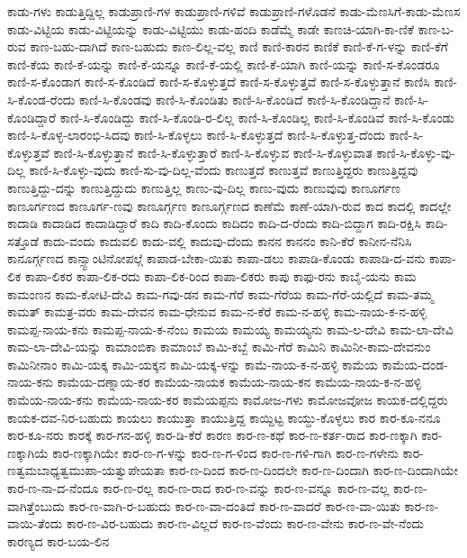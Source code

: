 ಕಾಡು-ಗಳು
ಕಾಡುತ್ತಿದ್ದಿಲ್ಲ
ಕಾಡುಪ್ರಾಣಿ-ಗಳ
ಕಾಡುಪ್ರಾಣಿ-ಗಳಿವೆ
ಕಾಡುಪ್ರಾಣಿ-ಗಳೊಡನೆ
ಕಾಡು-ಮೆಣಸಿಗೆ-ಕಾಡು-ಮೆಣಸ
ಕಾಡು-ವಿಟ್ಟಿಯ
ಕಾಡು-ವಿಟ್ಟಿಯನ್ನು
ಕಾಡು-ವಿಟ್ಟಿಯು
ಕಾಡು-ಹಂದಿ
ಕಾಡೆಮ್ಮೆ
ಕಾಡೇ
ಕಾಣಚಿ-ಯಾಗಿ-ಕಾ-ಣಿಕೆ
ಕಾಣ-ಬ-ರುವ
ಕಾಣ-ಬಹು-ದಾಗಿದೆ
ಕಾಣ-ಬಹುದು
ಕಾಣ-ಲಿಲ್ಲ-ವಲ್ಲ
ಕಾಣಿ
ಕಾಣಿ-ಕಾರನ
ಕಾಣಿಕೆ
ಕಾಣಿ-ಕೆ-ಗ-ಳನ್ನು
ಕಾಣಿ-ಕೆಗೆ
ಕಾಣಿ-ಕೆಯ
ಕಾಣಿ-ಕೆ-ಯನ್ನು
ಕಾಣಿ-ಕೆ-ಯನ್ನೂ
ಕಾಣಿ-ಕೆ-ಯಲ್ಲಿ
ಕಾಣಿ-ಕೆ-ಯಾಗಿ
ಕಾಣಿ-ಯನ್ನು
ಕಾಣಿ-ಸ-ಕೊಂಡರೂ
ಕಾಣಿ-ಸ-ಕೊಂಡಾಗ
ಕಾಣಿ-ಸ-ಕೊಂಡಿದೆ
ಕಾಣಿ-ಸ-ಕೊಳ್ಳುತ್ತದೆ
ಕಾಣಿ-ಸ-ಕೊಳ್ಳುತ್ತವೆ
ಕಾಣಿ-ಸ-ಕೊಳ್ಳುತ್ತಾನೆ
ಕಾಣಿಸಿ
ಕಾಣಿ-ಸಿ-ಕೊಂಡ-ರೆಂದು
ಕಾಣಿ-ಸಿ-ಕೊಂಡವು
ಕಾಣಿ-ಸಿ-ಕೊಂಡಿತು
ಕಾಣಿ-ಸಿ-ಕೊಂಡಿದೆ
ಕಾಣಿ-ಸಿ-ಕೊಂಡಿದ್ದಾನೆ
ಕಾಣಿ-ಸಿ-ಕೊಂಡಿದ್ದಾರೆ
ಕಾಣಿ-ಸಿ-ಕೊಂಡಿದ್ದು
ಕಾಣಿ-ಸಿ-ಕೊಂಡಿ-ರ-ಲಿಲ್ಲ
ಕಾಣಿ-ಸಿ-ಕೊಂಡಿಲ್ಲ
ಕಾಣಿ-ಸಿ-ಕೊಂಡಿವೆ
ಕಾಣಿ-ಸಿ-ಕೊಂಡು
ಕಾಣಿ-ಸಿ-ಕೊಳ್ಳ-ಲಾರಂಭಿ-ಸಿದವು
ಕಾಣಿ-ಸಿ-ಕೊಳ್ಳಲು
ಕಾಣಿ-ಸಿ-ಕೊಳ್ಳುತ್ತದೆ
ಕಾಣಿ-ಸಿ-ಕೊಳ್ಳುತ್ತ-ದೆಂದು
ಕಾಣಿ-ಸಿ-ಕೊಳ್ಳುತ್ತವೆ
ಕಾಣಿ-ಸಿ-ಕೊಳ್ಳುತ್ತಾನೆ
ಕಾಣಿ-ಸಿ-ಕೊಳ್ಳುತ್ತಾರೆ
ಕಾಣಿ-ಸಿ-ಕೊಳ್ಳುವ
ಕಾಣಿ-ಸಿ-ಕೊಳ್ಳುವಾತ
ಕಾಣಿ-ಸಿ-ಕೊಳ್ಳು-ವು-ದಿಲ್ಲ
ಕಾಣಿ-ಸಿ-ಕೊಳ್ಳು-ವುದು
ಕಾಣಿ-ಸು-ವು-ದಿಲ್ಲ-ವೆಂದು
ಕಾಣುತ್ತದೆ
ಕಾಣುತ್ತವೆ
ಕಾಣುತ್ತಿದ್ದರು
ಕಾಣುತ್ತಿದ್ದವು
ಕಾಣುತ್ತಿದ್ದು-ದನ್ನು
ಕಾಣುತ್ತಿದ್ದುದು
ಕಾಣುತ್ತಿಲ್ಲ
ಕಾಣು-ವು-ದಿಲ್ಲ
ಕಾಣು-ವುದು
ಕಾಣುವುವು
ಕಾಣೂರ್ಗಣ
ಕಾಣೂರ್ಗಣದ
ಕಾಣೂರ್ಗ-ಣವು
ಕಾಣೂರ್ಗ್ಗಣ
ಕಾಣೂರ್ಗ್ಗಣದ
ಕಾಣೆಮೆ
ಕಾಣೆ-ಯಾಗಿ-ರುವ
ಕಾದ
ಕಾದಲ್ಲಿ
ಕಾದಲ್ಲೇ
ಕಾದಾಡಿ
ಕಾದಾಡಿದ
ಕಾದಾಡಿದ್ದಾರೆ
ಕಾದಿ
ಕಾದಿ-ಕೊಂದು
ಕಾದಿದಂ
ಕಾದಿ-ದ-ರೆಂದು
ಕಾದಿ-ಬಿದ್ದಾಗ
ಕಾದಿ-ರಕ್ಷಿಸಿ
ಕಾದಿ-ಸತ್ತೊಡೆ
ಕಾದು-ವಂದು
ಕಾದುವಲಿ
ಕಾದು-ವಲ್ಲಿ
ಕಾದುವು-ದೆಂದು
ಕಾನನ
ಕಾನನಂ
ಕಾನಿ-ಕೆರೆ
ಕಾನೀನ-ನೆನಿಸಿ
ಕಾನೂರ್ಗ್ಗಣದ
ಕಾನ್ಸ್ಟಾಂಟಿನೋಪಲ್ಗೆ
ಕಾಪಾಡ-ಬೇಕಾ-ಯಿತು
ಕಾಪಾ-ಡಲು
ಕಾಪಾಡಿ-ಕೊಂಡು
ಕಾಪಾಡಿ-ದ-ವನು
ಕಾಪಾ-ಲಿಕ
ಕಾಪಾ-ಲಿಕರ
ಕಾಪಾ-ಲಿಕ-ರದು
ಕಾಪಾ-ಲಿಕ-ರಿಂದ
ಕಾಪಾ-ಲಿಕರು
ಕಾಪು
ಕಾಫು-ರನು
ಕಾಬೈ-ಯನು
ಕಾಮ
ಕಾಮಂಣನ
ಕಾಮ-ಕೋಟಿ-ದೇವಿ
ಕಾಮ-ಗವು-ಡನ
ಕಾಮ-ಗೆರೆ
ಕಾಮ-ಗೆರೆಯ
ಕಾಮ-ಗೆರೆ-ಯಲ್ಲಿದೆ
ಕಾಮ-ತಮ್ಮ
ಕಾಮತ್
ಕಾಮತ್ರ-ವರು
ಕಾಮ-ದೇವನ
ಕಾಮ-ಧೇನುವ
ಕಾಮ-ನ-ಕೆರೆ
ಕಾಮ-ನ-ಹಳ್ಳಿ
ಕಾಮ-ನಾಯ-ಕ-ನ-ಹಳ್ಳಿ
ಕಾಮಪ್ಪ-ನಾಯ-ಕನು
ಕಾಮಪ್ಪ-ನಾಯ-ಕ-ನೆಂಬ
ಕಾಮಯ
ಕಾಮಯ್ಯ
ಕಾಮಯ್ಯನು
ಕಾಮ-ಲ-ದೇವಿ
ಕಾಮ-ಲಾ-ದೇವಿ
ಕಾಮ-ಲಾ-ದೇವಿ-ಯನ್ನು
ಕಾಮಾಂಬಿಕಾ
ಕಾಮಾಂಬೆ
ಕಾಮಿ-ಕಬ್ಬೆ
ಕಾಮಿ-ಗೆರೆ
ಕಾಮಿನಿ
ಕಾಮಿನೀ-ಕಾಮ-ದೇವನುಂ
ಕಾಮಿನೀನಾಂ
ಕಾಮಿ-ಯಕ್ಕ
ಕಾಮಿ-ಯಕ್ಕನ
ಕಾಮಿ-ಯಕ್ಕ-ಳನ್ನು
ಕಾಮೆ-ನಾಯ-ಕ-ನ-ಹಳ್ಳಿ
ಕಾಮೆಯ
ಕಾಮೆಯ-ದಂಡ-ನಾಯ-ಕನು
ಕಾಮೆಯ-ದಣ್ನಾಯ-ಕರ
ಕಾಮೆಯ-ನಾಯಕ
ಕಾಮೆಯ-ನಾಯ-ಕನ
ಕಾಮೆಯ-ನಾಯ-ಕ-ನ-ಹಳ್ಳಿ
ಕಾಮೆಯ-ನಾಯ-ಕನು
ಕಾಮೆಯ-ನಾಯ-ಕರ
ಕಾಮೆಯಪ್ಪನು
ಕಾಮೋಜ-ಗಳು
ಕಾಮೋಜವೋಜ
ಕಾಯಕ-ದಲ್ಲಿದ್ದರು
ಕಾಯಕ-ದವ-ನಿರ-ಬಹುದು
ಕಾಯಲು
ಕಾಯುತ್ತಾ
ಕಾಯುತ್ತಿದ್ದ
ಕಾಯ್ದಿಟ್ಟ
ಕಾಯ್ದು-ಕೊಳ್ಳಲು
ಕಾರ
ಕಾರ-ಕೂ-ನನೂ
ಕಾರ-ಕೂ-ನರು
ಕಾರಕ್ಕೆ
ಕಾರ-ಗನ-ಹಳ್ಳಿ
ಕಾರ-ಡಿ-ಕೆರೆ
ಕಾರಣ
ಕಾರ-ಣ-ಕಥೆ
ಕಾರ-ಣ-ಕರ್ತ-ರಾದ
ಕಾರ-ಣಕ್ಕಾಗಿ
ಕಾರ-ಣಕ್ಕಾಗಿಯೆ
ಕಾರ-ಣಕ್ಕಾಗಿಯೇ
ಕಾರ-ಣ-ಗ-ಳನ್ನು
ಕಾರ-ಣ-ಗ-ಳಿಂದ
ಕಾರ-ಣ-ಗಳಿ-ಗಾಗಿ
ಕಾರ-ಣ-ಗಳೇನು
ಕಾರ-ಣತ್ವಮಬಾಧ್ಯತ್ವಮುಪಾ-ಯತ್ವುಪೇಯತಾ
ಕಾರ-ಣ-ದಿಂದ
ಕಾರ-ಣ-ದಿಂದಲೇ
ಕಾರ-ಣ-ದಿಂದಾಗಿ
ಕಾರ-ಣ-ದಿಂದಾಗಿಯೇ
ಕಾರ-ಣ-ನಾ-ದ-ನೆಂದೂ
ಕಾರ-ಣ-ರಲ್ಲ
ಕಾರ-ಣ-ರಾದ
ಕಾರ-ಣ-ವನ್ನು
ಕಾರ-ಣ-ವನ್ನೂ
ಕಾರ-ಣ-ವಲ್ಲ
ಕಾರ-ಣ-ವಾಗಿತ್ತೆಂಬುದು
ಕಾರ-ಣ-ವಾಗಿ-ರ-ಬಹುದು
ಕಾರ-ಣ-ವಾ-ದಂತಿದೆ
ಕಾರ-ಣ-ವಾದರೆ
ಕಾರ-ಣ-ವಾ-ಯಿತು
ಕಾರ-ಣ-ವಾಯಿ-ತೆಂದು
ಕಾರ-ಣ-ವಿರ-ಬಹುದು
ಕಾರ-ಣ-ವಿಲ್ಲದೆ
ಕಾರ-ಣ-ವೆಂದು
ಕಾರ-ಣ-ವೇನು
ಕಾರ-ಣ-ವೇ-ನೆಂದು
ಕಾರಣ್ಯದ
ಕಾರ-ಬಯ-ಲಿನ
